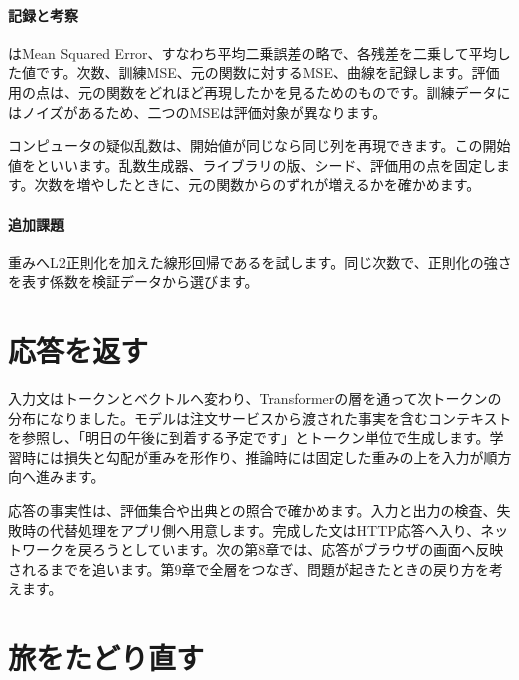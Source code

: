 \paragraph{記録と考察}
        はMean Squared Error、すなわち平均二乗誤差の略で、各残差を二乗して平均した値です。次数、訓練MSE、元の関数に対するMSE、曲線を記録します。評価用の点は、元の関数をどれほど再現したかを見るためのものです。訓練データにはノイズがあるため、二つのMSEは評価対象が異なります。

        コンピュータの疑似乱数は、開始値が同じなら同じ列を再現できます。この開始値をといいます。乱数生成器、ライブラリの版、シード、評価用の点を固定します。次数を増やしたときに、元の関数からのずれが増えるかを確かめます。

\paragraph{追加課題}
        重みへL2正則化を加えた線形回帰であるを試します。同じ次数で、正則化の強さを表す係数を検証データから選びます。

\par
\endgroup
\par
\endgroup


\section{応答を返す}
\label{sec:06-machine-learning-35}

入力文はトークンとベクトルへ変わり、Transformerの層を通って次トークンの分布になりました。モデルは注文サービスから渡された事実を含むコンテキストを参照し、「明日の午後に到着する予定です」とトークン単位で生成します。学習時には損失と勾配が重みを形作り、推論時には固定した重みの上を入力が順方向へ進みます。

応答の事実性は、評価集合や出典との照合で確かめます。入力と出力の検査、失敗時の代替処理をアプリ側へ用意します。完成した文はHTTP応答へ入り、ネットワークを戻ろうとしています。次の第8章では、応答がブラウザの画面へ反映されるまでを追います。第9章で全層をつなぎ、問題が起きたときの戻り方を考えます。



\section{旅をたどり直す}
\label{sec:06-machine-learning-36}

